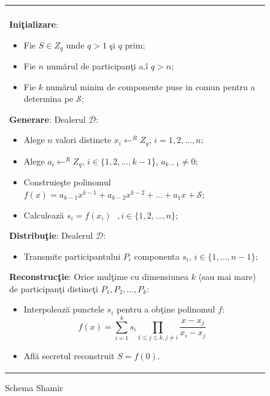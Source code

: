 \documentclass{llncs}
\begin{document}
\begin{figure}[h!]

\begin{tabular}{|p{\textwidth}|}
\hline

\\
\hspace{.1in}
\textbf{Ini\c{t}ializare}: 
	\begin{itemize}
		\item Fie $S \in Z_q$ unde $q > 1 $ \c{s}i $q$ prim;
		\item Fie $n$ num\u{a}rul de participan\c{t}i a.\^{i} $q > n$;
		\item Fie $k$ num\u{a}rul minim de componente puse in comun pentru a determina pe $\mathcal{S}$;
	\end{itemize}
\medskip

\hspace{.1in}
\textbf{Generare}: Dealerul $\mathcal{D}$:
	\begin{itemize}
		\item Alege $n$ valori distincte $x_i \leftarrow^R Z_q \text{, }i = 1,2,\dots,n$;
		\item Alege $a_{i} \leftarrow^R Z_q \text{, }i \in \{1,2,\dots,{k - 1}$\}, $a_{k-1} \neq 0$;
		\item Construie\c{s}te polinomul $f(x) = a_{k - 1}x ^ {k-1} + a_{k-2}x ^ {k - 2} + \dots + a_1x + \mathcal{S}$;
		\item Calculeaz\u{a} $s_i = f(x_i) \text{ }, i \in \{1,2,\dots,n\}$;
	\end{itemize}
\medskip

\hspace{.1in}
\textbf{Distribu\c{t}ie}: Dealerul $\mathcal{D}$:
	\begin{itemize}
		\item Transmite participantului $P_i$ componenta $s_i$, $i \in \{1,\dots,n-1\}$;
	\end{itemize}

\hspace{.1in}
\textbf{Reconstruc\c{t}ie}: Orice mul\c{t}ime cu dimensiunea $k$ (sau mai mare) de participan\c{t}i distinc\c{t}i $P_1, P_2, \dots, P_k$:
	\begin{itemize}
		\setlength{\itemsep}{5pt}
		\item Interpoleaz\u{a} punctele $s_i$ pentru a ob\c{t}ine polinomul $f$:
		\begin{equation} f(x)=\sum_{i=1}^{k} {s_i}\prod_{1 \leq j \leq k, j \neq i} \frac{x-x_j}{x_i-x_j} \end{equation}
		\item Afl\u{a} secretul reconstruit $S = f(0)$.
	\end{itemize}

\\
\hline
\end{tabular}

\caption{Schema Shamir \cite{S:1979}}
\label{fig:shamir_scheme}
\end{figure}
\end{document}
